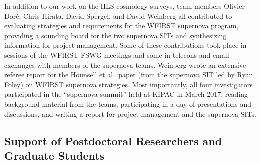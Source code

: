 In addition to our work on the HLS cosmology surveys,
team members Olivier Dor\'e, Chris Hirata, David Spergel,
and David Weinberg all contributed to evaluating strategies and
requirements for the WFIRST supernova program, providing a
sounding board for the two supernova SITs and synthesizing
information for project management.  Some of these contributions
took place in sessions of the WFIRST FSWG meetings and some
 in telecons and email exchanges with members of the
supernova teams.  Weinberg wrote an extensive referee report
for the Hounsell et al.\ paper (from the supernova SIT led by
Ryan Foley) on WFIRST supernova strategies.  Most importantly,
all four investigators participated in the ``supernova summit''
held at KIPAC in March 2017, reading background material from
the teams, participating in a day of presentations and discussions,
and writing a report for project management and the supernova SITs.


\subsection{Support of Postdoctoral Researchers and Graduate Students}

